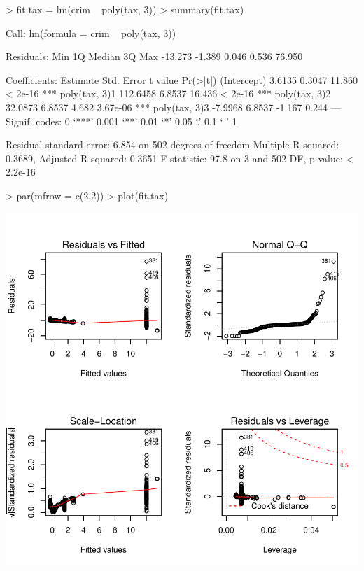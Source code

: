 \documentclass[a4paper]{article}
\begin{document}
\begin{Schunk}
\begin{Sinput}
> fit.tax = lm(crim ~ poly(tax, 3))
> summary(fit.tax)
\end{Sinput}
\begin{Soutput}
Call:
lm(formula = crim ~ poly(tax, 3))

Residuals:
    Min      1Q  Median      3Q     Max 
-13.273  -1.389   0.046   0.536  76.950 

Coefficients:
              Estimate Std. Error t value Pr(>|t|)    
(Intercept)     3.6135     0.3047  11.860  < 2e-16 ***
poly(tax, 3)1 112.6458     6.8537  16.436  < 2e-16 ***
poly(tax, 3)2  32.0873     6.8537   4.682 3.67e-06 ***
poly(tax, 3)3  -7.9968     6.8537  -1.167    0.244    
---
Signif. codes:  0 ‘***’ 0.001 ‘**’ 0.01 ‘*’ 0.05 ‘.’ 0.1 ‘ ’ 1

Residual standard error: 6.854 on 502 degrees of freedom
Multiple R-squared:  0.3689,	Adjusted R-squared:  0.3651 
F-statistic:  97.8 on 3 and 502 DF,  p-value: < 2.2e-16
\end{Soutput}
\begin{Sinput}
> par(mfrow = c(2,2))
> plot(fit.tax)
\end{Sinput}
\end{Schunk}
\includegraphics{mutivariblelm-tax2}
\end{document}
